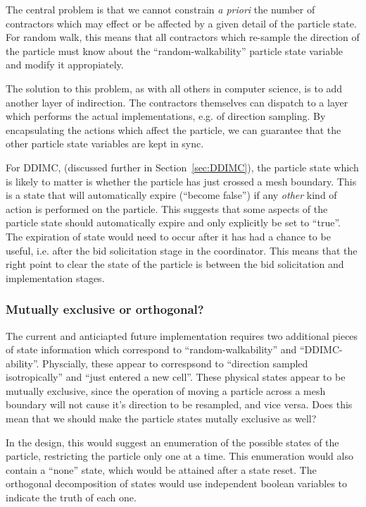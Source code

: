 \documentclass[memo]{ResearchNote}
\begin{document}
The central problem is that we cannot constrain {\em a priori} the
number of contractors which may effect or be affected by a given
detail of the particle state. For random walk, this means that all
contractors which re-sample the direction of the particle must know
about the ``random-walkability'' particle state variable and modify it
appropiately.

The solution to this problem, as with all others in computer science,
is to add another layer of indirection. The contractors themselves can
dispatch to a layer which performs the actual implementations, e.g. of
direction sampling. By encapsulating the actions which affect the
particle, we can guarantee that the other particle state variables are
kept in sync.

For DDIMC, (discussed further in Section~\ref{sec:DDIMC}), the
particle state which is likely to matter is whether the particle has
just crossed a mesh boundary. This is a state that will automatically
expire (``become false'') if any {\em other} kind of action is
performed on the particle. This suggests that some aspects of the
particle state should automatically expire and only explicitly be set
to ``true''.  The expiration of state would need to occur after it has
had a chance to be useful, i.e. after the bid solicitation stage in
the coordinator. This means that the right point to clear the state of
the particle is between the bid solicitation and implementation
stages.

\subsubsection{Mutually exclusive or orthogonal?}

The current and anticiapted future implementation requires two
additional pieces of state information which correspond to
``random-walkability'' and ``DDIMC-ability''. Physcially, these appear
to correspsond to ``direction sampled isotropically'' and ``just
entered a new cell''. These physical states appear to be mutually
exclusive, since the operation of moving a particle across a mesh
boundary will not cause it's direction to be resampled, and vice
versa. Does this mean that we should make the particle states mutally
exclusive as well?

In the design, this would suggest an enumeration of the possible
states of the particle, restricting the particle only one at a time.
This enumeration would also contain a ``none'' state, which would be
attained after a state reset. The orthogonal decomposition of states
would use independent boolean variables to indicate the truth of each
one.
\end{document}
